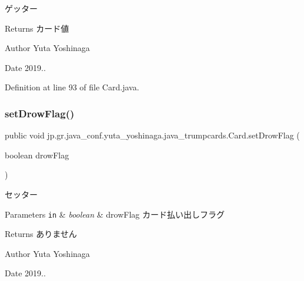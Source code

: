 ゲッター 

\begin{DoxyReturn}{Returns}
カード値 
\end{DoxyReturn}
\begin{DoxyAuthor}{Author}
Yuta Yoshinaga 
\end{DoxyAuthor}
\begin{DoxyDate}{Date}
2019.. 
\end{DoxyDate}


Definition at line 93 of file Card.\+java.

\mbox{\label{classjp_1_1gr_1_1java__conf_1_1yuta__yoshinaga_1_1java__trumpcards_1_1_card_a52e0de709fd788e13ad930562e8e4be2}} 
\subsubsection{\texorpdfstring{set\+Drow\+Flag()}{setDrowFlag()}}
{\footnotesize\ttfamily public void jp.\+gr.\+java\+\_\+conf.\+yuta\+\_\+yoshinaga.\+java\+\_\+trumpcards.\+Card.\+set\+Drow\+Flag (\begin{DoxyParamCaption}\item[{boolean}]{drow\+Flag }\end{DoxyParamCaption})}



セッター 


\begin{DoxyParams}[1]{Parameters}
\mbox{\tt in}  & {\em boolean} & drow\+Flag カード払い出しフラグ \\
\hline
\end{DoxyParams}
\begin{DoxyReturn}{Returns}
ありません 
\end{DoxyReturn}
\begin{DoxyAuthor}{Author}
Yuta Yoshinaga 
\end{DoxyAuthor}
\begin{DoxyDate}{Date}
2019.. 
\end{DoxyDate}


